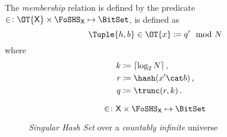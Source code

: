 \documentclass[ ../main.tex]{subfiles}
\begin{document}
The \emph{membership} relation is defined by the predicate $\SetContains \colon \OT{\Set{X}} \times \FoSHS_{\Set{X}} \mapsto \BitSet$, is defined as
\begin{equation}
\Tuple{h,b} \SetContains \OT{x} \coloneqq q' \mod N
\end{equation}
where
\begin{equation}
\begin{split}
k &\coloneqq \lceil \log_2 N \rceil\,,\\
r &\coloneqq \hash(x' \cat b)\,,\\
q &\coloneqq \trunc(r,k)\,.
\end{split}
\end{equation}



\begin{definition}
\begin{equation}
\SetContains \colon \Set{X} \times \FoSHS_{\Set{X}} \mapsto \BitSet
\end{equation}

\end{definition}


\begin{figure}
    \centering
    
    \caption{\emph{Singular Hash Set} over a \emph{countably infinite} universe}
    \label{fig:my_label}
\end{figure}
\end{document}
